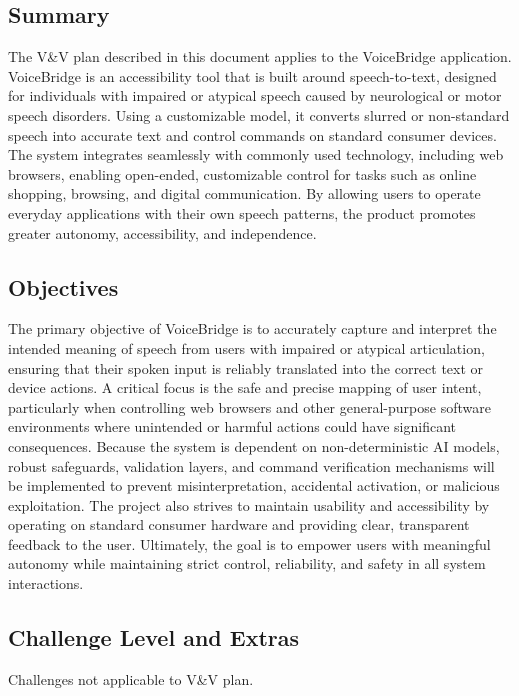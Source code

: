 \documentclass[12pt, titlepage]{article}
\begin{document}
\subsection{Summary}

The V\&V plan described in this document applies to the VoiceBridge application. VoiceBridge is an accessibility tool that is built around speech-to-text, designed for individuals with impaired or atypical speech caused by neurological or motor speech disorders. Using a customizable model, it converts slurred or non-standard speech into accurate text and control commands on standard consumer devices. The system integrates seamlessly with commonly used technology, including web browsers, enabling open-ended, customizable control for tasks such as online shopping, browsing, and digital communication. By allowing users to operate everyday applications with their own speech patterns, the product promotes greater autonomy, accessibility, and independence.

\subsection{Objectives}

The primary objective of VoiceBridge is to accurately capture and interpret the intended meaning of speech from users with impaired or atypical articulation, ensuring that their spoken input is reliably translated into the correct text or device actions. A critical focus is the safe and precise mapping of user intent, particularly when controlling web browsers and other general-purpose software environments where unintended or harmful actions could have significant consequences. Because the system is dependent on non-deterministic AI models, robust safeguards, validation layers, and command verification mechanisms will be implemented to prevent misinterpretation, accidental activation, or malicious exploitation. The project also strives to maintain usability and accessibility by operating on standard consumer hardware and providing clear, transparent feedback to the user. Ultimately, the goal is to empower users with meaningful autonomy while maintaining strict control, reliability, and safety in all system interactions.

\subsection{Challenge Level and Extras}

Challenges not applicable to V\&V plan.
\end{document}
